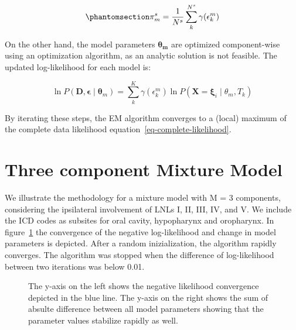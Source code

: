 \documentclass[
  sn-mathphys-num,
]{sn-jnl}
\begin{document}
\begin{equation}\phantomsection\label{eq-mixture-maximization}{
\pi_m^s = \frac{1}{N^s} \sum_k^{N^s} \gamma(\epsilon^m_k)
}\end{equation}

On the other hand, the model parameters \(\boldsymbol{\theta_m}\) are
optimized component-wise using an optimization algorithm, as an analytic
solution is not feasible. The updated log-likelihood for each model is:

\[
\ln P(\mathbf{D}, \boldsymbol{\epsilon} \mid \boldsymbol{\theta}_m) = \sum_{k}^K \gamma(\epsilon^m_{k}) \ln P(\mathbf{X} = \boldsymbol{\xi}_i \mid \theta_m, T_k)
\]

By iterating these steps, the EM algorithm converges to a (local)
maximum of the complete data likelihood
equation~\ref{eq-complete-likelihood}.

\section{Three component Mixture Model}\label{sec-3comp}

We illustrate the methodology for a mixture model with M = 3 components,
considering the ipsilateral involvement of LNLs I, II, III, IV, and V.
We include the ICD codes as subsites for oral cavity, hypopharynx and
oropharynx. In figure~\ref{fig-convergence} the convergence of the
negative log-likelihood and change in model parameters is depicted.
After a random inizialization, the algorithm rapidly converges. The
algorithm was stopped when the difference of log-likelihood between two
iterations was below 0.01.

\begin{figure}


\caption{\label{fig-convergence}The y-axis on the left shows the
negative likelihood convergence depicted in the blue line. The y-axis on
the right shows the sum of absulte difference between all model
parameters showing that the parameter values stabilize rapidly as well.}

\end{figure}%
\end{document}
